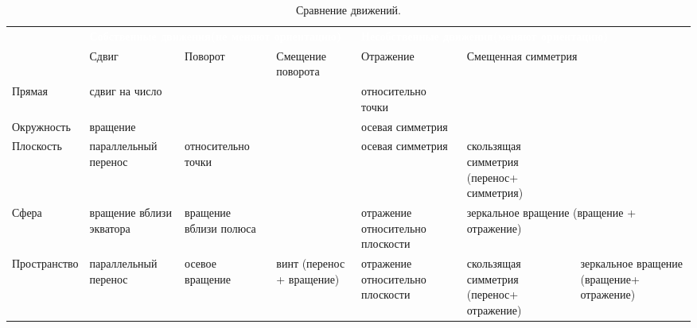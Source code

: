 \begin{table}
\caption{Сравнение движений.}
\label{Transitions}
\begin{tabular}{p{2cm}|p{2.8cm}p{2.5cm}p{2.8cm}p{2.5cm}p{2.5cm}p{2.5cm}}
\rowcolor{darkred}
& \multicolumn{3}{P{9.1cm}}{\textcolor{white}{\bfseries Собственные движения\linebreak (не меняют ориентацию)}} & \multicolumn{3}{P{8.5cm}}{\textcolor{white}{\bfseries Несобственные движения\linebreak (меняют ориентацию)}} \\ 
& Сдвиг & Поворот & Смещение поворота & Отражение & \multicolumn{2}{p{5cm}}{Смещенная симметрия} \\ \hline \hline
Прямая     & сдвиг на число & & & относи\-тель\-но точки & & \\  \hline
Окруж\-ность & \multicolumn{2}{p{5cm}}{\centerline{вращение}} & & осевая симметрия & & \\ \hline
Плос\-кость  & параллель\-ный перенос & относи\-тель\-но точки & & осевая симметрия & скользящая симметрия (перенос+ сим\-мет\-рия) & \\  \hline
Сфера & вращение вблизи экватора & вращение вблизи полюса & & отражение относительно плоскости & \multicolumn{2}{p{5cm}}{зеркальное вращение (вращение + отражение)} \\ \hline
Прост\-ранство & параллель\-ный перенос & осевое вращение & винт (перенос + вращение) & отражение относительно плоскости & скользящая симметрия (перенос+ отражение) & зеркальное вращение (вращение+ отражение) \\ \hline \hline
\end{tabular}
\end{table}

